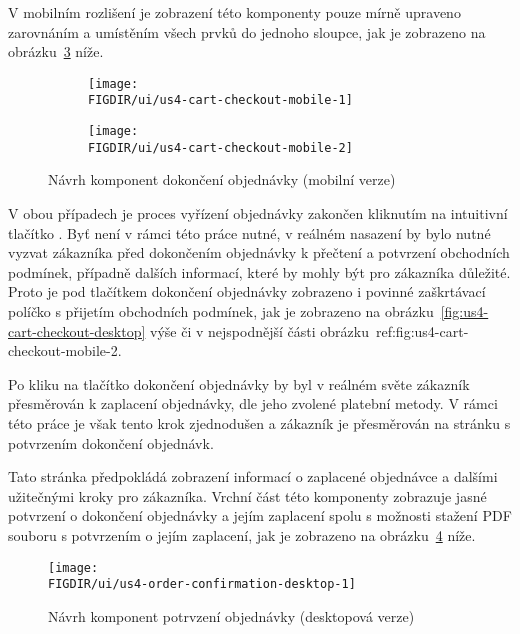 V mobilním rozlišení je zobrazení této komponenty pouze mírně upraveno zarovnáním a umístěním všech prvků do jednoho sloupce, jak je zobrazeno na obrázku~\ref{fig:us4-cart-checkout-mobile} níže.

\begin{figure}[H]
    \centering
    \begin{subfigure}{0.4\textwidth}
        \texttt{[image: \\FIGDIR/ui/us4-cart-checkout-mobile-1]}
        \label{fig:us4-cart-checkout-mobile-1}
    \end{subfigure}
    \hfill
    \begin{subfigure}{0.4\textwidth}
        \texttt{[image: \\FIGDIR/ui/us4-cart-checkout-mobile-2]}
        \label{fig:us4-cart-checkout-mobile-2}
    \end{subfigure}

    \caption{Návrh komponent dokončení objednávky (mobilní verze)}
    \label{fig:us4-cart-checkout-mobile}
\end{figure}

V obou případech je proces vyřízení objednávky zakončen kliknutím na intuitivní tlačítko .
Byť není v rámci této práce nutné, v reálném nasazení by bylo nutné vyzvat zákazníka před dokončením objednávky k přečtení a potvrzení obchodních podmínek, případně dalších informací, které by mohly být pro zákazníka důležité.
Proto je pod tlačítkem dokončení objednávky zobrazeno i povinné zaškrtávací políčko s přijetím obchodních podmínek, jak je zobrazeno na obrázku~\ref{fig:us4-cart-checkout-desktop} výše či v nejspodnější části obrázku~{ref:fig:us4-cart-checkout-mobile-2}.

Po kliku na tlačítko dokončení objednávky by byl v reálném světe zákazník přesměrován k zaplacení objednávky, dle jeho zvolené platební metody.
V rámci této práce je však tento krok zjednodušen a zákazník je přesměrován na stránku s potvrzením dokončení objednávk.

Tato stránka předpokládá zobrazení informací o zaplacené objednávce a dalšími užitečnými kroky pro zákazníka.
Vrchní část této komponenty zobrazuje jasné potvrzení o dokončení objednávky a jejím zaplacení spolu s možnosti stažení PDF souboru s potvrzením o jejím zaplacení, jak je zobrazeno na obrázku~\ref{fig:us4-order-confirmation-desktop} níže.

\begin{figure}[H]
    \centering
    \texttt{[image: \\FIGDIR/ui/us4-order-confirmation-desktop-1]}
    \caption{Návrh komponent potrvzení objednávky (desktopová verze)}
    \label{fig:us4-order-confirmation-desktop}
\end{figure}

